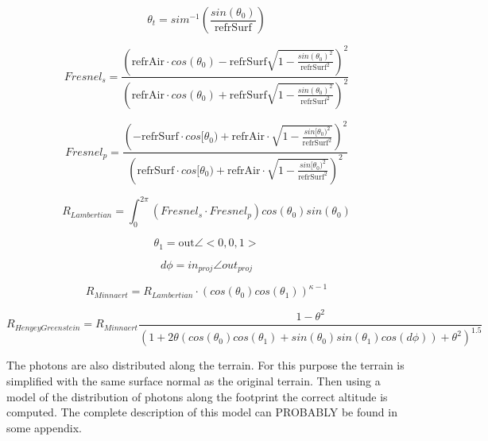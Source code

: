 \begin{equation}
	\theta _t = sim^{-1}\left(\frac{sin(\theta _0)}{\text{refrSurf}}\right)
	\label{eq:}
\end{equation}

\begin{equation}
Fresnel_s= \frac{\left(\text{refrAir} \cdot cos(\theta _0)-\text{refrSurf}\sqrt{1-\frac{sin(\theta _0)^2}{\text{refrSurf}^2}}\right)^2}
							  {\left(\text{refrAir} \cdot cos(\theta _0)+\text{refrSurf} \sqrt{1-\frac{sin(\theta _0)^2}{\text{refrSurf}^2}}\right)^2}
\end{equation}

\begin{equation}
	Fresnel_p = \frac{\left(-\text{refrSurf} \cdot cos[\theta _0)+\text{refrAir} \cdot \sqrt{1-\frac{sin[\theta _0)^2} {\text{refrSurf}^2}} \right)^2}
								 	 {\left(\text{refrSurf} \cdot cos[\theta _0)+\text{refrAir} \cdot \sqrt{1-\frac{sin[\theta _0)^2} {\text{refrSurf}^2}} \right)^2}
\end{equation}

\begin{equation}
	R_{Lambertian} = \int_0^{2\pi} \left(Fresnel_s \cdot Fresnel_p \right) cos(\theta _0)sin(\theta _0)
\end{equation}

\begin{equation}
	\theta_1 = \text{out} \angle <0,0,1>
\end{equation}

\begin{equation} 
	d \phi = in_{proj} \angle out_{proj}
\end{equation}

\begin{equation}
	R_{Minnaert} = R_{Lambertian} \cdot (cos(\theta _0) cos(\theta _1))^{\kappa-1}
\end{equation}

\begin{equation}
	R_{HenyeyGreenstein}=R_{Minnaert} \frac{1 - \theta^2 }{ (1 + 2 \theta (cos(\theta_0) cos(\theta _1) + sin(\theta _0)  sin(\theta _1) cos(d \phi))+ \theta^2 )^{1.5}}
\end{equation}

The photons are also distributed along the terrain. For this purpose the terrain is simplified with the same surface normal as the original terrain. Then using a model of the distribution of photons along the footprint the correct altitude is computed. The complete description of this model can PROBABLY be found in some appendix.

